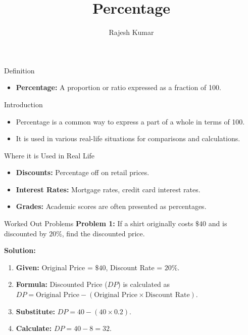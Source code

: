 
\title{Percentage}
\author{Rajesh Kumar}
\date{}

\begin{frame}
  \titlepage
\end{frame}

\begin{frame}{Definition}
  \begin{itemize}
    \item \textbf{Percentage:} A proportion or ratio expressed as a fraction of 100.
  \end{itemize}
\end{frame}

\begin{frame}{Introduction}
  \begin{itemize}
    \item Percentage is a common way to express a part of a whole in terms of 100.
    \item It is used in various real-life situations for comparisons and calculations.
  \end{itemize}
\end{frame}

\begin{frame}{Where it is Used in Real Life}
  \begin{itemize}
    \item \textbf{Discounts:} Percentage off on retail prices.
    \item \textbf{Interest Rates:} Mortgage rates, credit card interest rates.
    \item \textbf{Grades:} Academic scores are often presented as percentages.
  \end{itemize}
\end{frame}

\begin{frame}{Worked Out Problems}
  \textbf{Problem 1:} If a shirt originally costs $\$40$ and is discounted by $20\%$, find the discounted price.

  \textbf{Solution:}
  \begin{enumerate}
    \item \textbf{Given:} Original Price = $\$40$, Discount Rate = $20\%$.
    \item \textbf{Formula:} Discounted Price ($DP$) is calculated as $DP = \text{Original Price} - (\text{Original Price} \times \text{Discount Rate})$.
    \item \textbf{Substitute:} $DP = 40 - (40 \times 0.2)$.
    \item \textbf{Calculate:} $DP = 40 - 8 = 32$.
  \end{enumerate}
\end{frame}

